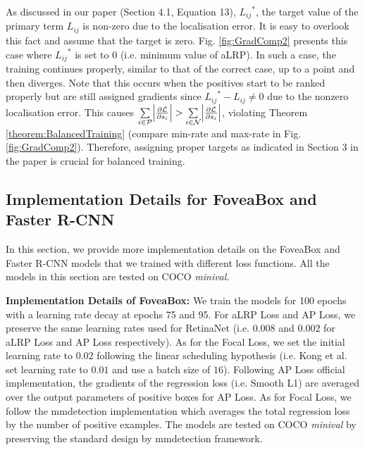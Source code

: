 \documentclass{article}
\begin{document}
As discussed in our paper (Section 4.1, Equation 13), ${L_{ij}}^*$, the target value of the primary term ${L_{ij}}$ is non-zero due to the localisation error. It is easy to overlook this fact and assume that the target is zero. Fig. \ref{fig:GradComp2} presents this case where ${L_{ij}}^*$ is set to 0 (i.e. minimum value of aLRP). In such a case, the training continues properly, similar to that of the correct case, up to a point and then diverges. Note that this occurs when the positives start to be ranked properly but are still assigned gradients since ${L_{ij}}^*-{L_{ij}} \neq 0$ due to the nonzero localisation error. This causes $\sum \limits_{i \in \mathcal{P}} \abs{\frac{\partial \mathcal{L}}{\partial s_i}} > \sum \limits_{i \in \mathcal{N}} \abs{\frac{\partial \mathcal{L}}{\partial s_i}}$, violating Theorem \ref{theorem:BalancedTraining} (compare min-rate and max-rate in Fig. \ref{fig:GradComp2}). Therefore, assigning proper targets as indicated in Section 3 in the paper is crucial for balanced training. 

\subsection{Implementation Details for FoveaBox and Faster R-CNN}
In this section, we provide more implementation details on the FoveaBox and Faster R-CNN models that we trained with different loss functions. All the models in this section are tested on COCO \textit{minival}.

\textbf{Implementation Details of FoveaBox:} We train the models for 100 epochs with a learning rate decay at epochs 75 and 95. For aLRP Loss and AP Loss, we preserve the same learning rates used for RetinaNet (i.e. $0.008$ and $0.002$ for aLRP Loss and AP Loss respectively). As for the Focal Loss, we set the initial learning rate to $0.02$ following the linear scheduling hypothesis \cite{MegDet} (i.e. Kong et al. set learning rate to $0.01$ and use a batch size of $16$). Following AP Loss official implementation, the gradients of the regression loss (i.e. Smooth L1) are averaged over the output parameters of positive boxes for AP Loss. As for Focal Loss, we follow the mmdetection implementation which averages the total regression loss by the number of positive examples. The models are tested on COCO \textit{minival} by preserving the standard design by mmdetection framework.
\end{document}
